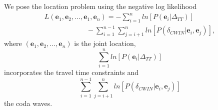 \documentclass[extra, onecolumn, doublespacing]{gji}
\begin{document}
We pose the location problem using the negative log likelihood
\begin{equation}
\label{eq-Lstar-tt-cwi}
\begin{array}{l}
 L(\mathbf{e}_1, \mathbf{e}_2, ...,
\mathbf{e}_1, \mathbf{e}_n) = - \sum_{i=1}^n
ln\left[P(\mathbf{e}_i|\Delta_{TT})\right] \\
\hspace{6em}  - \sum_{i=1}^{n-1}
\sum_{j=i+1}^n
ln\left[P(\delta_{CWIN}|\mathbf{e}_i,\mathbf{e}_j)\right],
\end{array}
\end{equation}
where $(\mathbf{e}_1, \mathbf{e}_2, ..., \mathbf{e}_n)$ is the joint
location,
\begin{equation}
\label{eq-ttcomponent} \sum_{i=1}^n
ln\left[P(\mathbf{e}_i|\Delta_{TT})\right]
\end{equation}
incorporates the travel time constraints and
\begin{equation}
\label{eq-codacomponent} \sum_{i=1}^{n-1} \sum_{j=i+1}^n
ln\left[P(\delta_{CWIN}|\mathbf{e}_i,\mathbf{e}_j)\right]
\end{equation}
 the coda waves.
\end{document}
